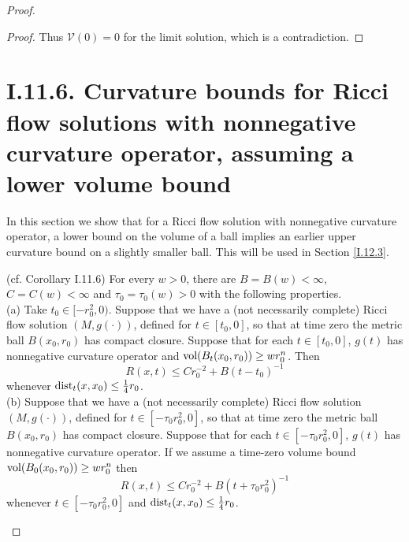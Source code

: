 \begin{proof}
\begin{proof}
Thus ${\mathcal V}(0) = 0$ for the limit solution, which is a contradiction.
\end{proof}

\section{I.11.6. Curvature bounds for Ricci flow solutions with
nonnegative curvature operator, assuming a lower volume bound}

In this section we show that for a Ricci flow solution with nonnegative
curvature operator, a lower bound on the volume of a ball
implies an earlier upper curvature bound on a slightly smaller ball.
This will be used in Section \ref{I.12.3}.

\begin{corollary}
  \label{cor:kl-curvature-bounds-ricci-flow-solutions-nonnegative-curvature-operator-ass-existence-curvature-operators}
 (cf. Corollary I.11.6) \label{corI.11.6}
For every $w > 0$, there are $B = B(w) < \infty$, $C = C(w) < \infty$ and
$\tau_0 = \tau_0(w) > 0$ with the following properties. \\
(a) Take  $t_0 \in  [- r_0^2, 0)$.
Suppose that we have a (not necessarily complete) Ricci flow
solution $(M, g(\cdot))$, defined for $t \in [t_0, 0]$, so that at time zero
the metric ball $B(x_0, r_0)$ has compact closure. Suppose that
for each $t \in [t_0, 0]$,
$g(t)$ has nonnegative curvature operator and $\operatorname{vol}(B_t(x_0, r_0))
\ge w r_0^n$. Then
\begin{equation} \label{Rbound3}
R(x,t) \le C r_0^{-2} + B (t - t_0)^{-1}
\end{equation}
whenever
$\operatorname{dist}_t(x, x_0) \le \frac14 r_0$. \\
(b)
Suppose that we have a (not necessarily complete) Ricci flow
solution $(M, g(\cdot))$, defined for $t \in [- \tau_0 r_0^2, 0]$,
so that at time zero
the metric ball $B(x_0, r_0)$ has compact closure. Suppose that
for each $t \in [- \tau_0 r_0^2, 0]$,
$g(t)$ has nonnegative curvature operator.
If we assume a time-zero volume bound $\operatorname{vol}(B_0(x_0, r_0))
\ge w r_0^n$ then
\begin{equation}
R(x,t) \le C r_0^{-2} + B (t + \tau_0 r_0^2)^{-1}
\end{equation}
whenever $t \in [- \tau_0 r_0^2,0]$ and $\operatorname{dist}_t(x, x_0) \le \frac14 r_0$.
\end{corollary}
\begin{remark}
  \label{rem:kl-curvature-bounds-ricci-flow-solutions-nonnegative-curvature-operator-ass-structural-remark-curvature-operators}


\end{remark}
\end{proof}
